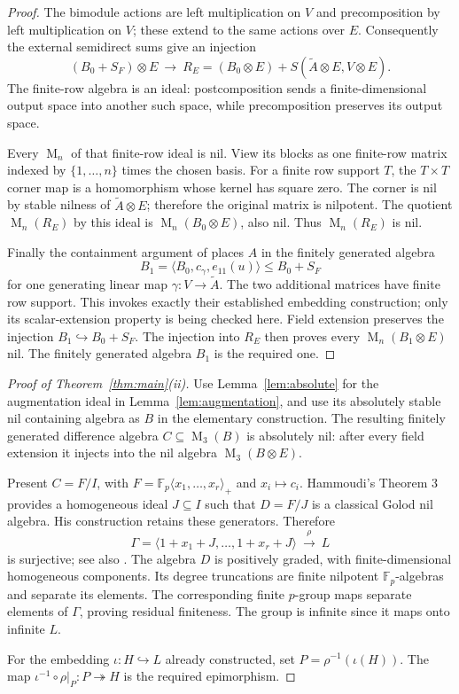 \documentclass[11pt]{article}
\theoremstyle{definition}
\newcommand{\Fp}{\mathbb F_p}
\newcommand{\Mat}{\operatorname{M}}
\begin{document}
\begin{proof}
The bimodule actions are left multiplication on \(V\) and precomposition
by left multiplication on \(V\); these extend to the same actions over
\(E\). Consequently the external semidirect sums give an injection
\[
 (B_0+S_F)\otimes E\ \longrightarrow\
 R_E=(B_0\otimes E)+S(\widetilde A\otimes E,V\otimes E).
\]
The finite-row algebra is an ideal: postcomposition sends a finite-dimensional
output space into another such space, while precomposition preserves its
output space.

Every \(\Mat_n\) of that finite-row ideal is nil. View its blocks as
one finite-row matrix indexed by \(\{1,\ldots,n\}\) times the chosen basis.
For a finite row support \(T\), the \(T\times T\) corner map is a
homomorphism whose kernel has square zero. The corner is nil by stable
nilness of \(\widetilde A\otimes E\); therefore the original matrix is
nilpotent. The quotient \(\Mat_n(R_E)\) by this ideal is
\(\Mat_n(B_0\otimes E)\), also nil. Thus \(\Mat_n(R_E)\) is nil.

Finally the containment argument of \cite[proof of Theorem 4.3]{AAJZ}
places \(A\) in the finitely generated algebra
\[
 B_1=\langle B_0,c_\gamma,e_{11}(u)\rangle\leq B_0+S_F
\]
for one generating linear map \(\gamma:V\to\widetilde A\).
The two additional matrices have finite row support.
This invokes exactly their established embedding construction; only
its scalar-extension property is being checked here.
Field extension preserves the injection \(B_1\hookrightarrow B_0+S_F\).
The injection into \(R_E\) then proves every \(\Mat_n(B_1\otimes E)\)
nil. The finitely generated algebra \(B_1\) is the required one.
\end{proof}

\begin{proof}[Proof of Theorem~\ref{thm:main}(ii)]
Use Lemma~\ref{lem:absolute} for the augmentation ideal in
Lemma~\ref{lem:augmentation}, and use its absolutely stable nil containing
algebra as \(B\) in the elementary construction.
The resulting finitely generated difference algebra
\(C\subseteq\Mat_3(B)\) is absolutely nil: after every field extension it
injects into the nil algebra \(\Mat_3(B\otimes E)\).

Present \(C=F/I\), with \(F=\Fp\langle x_1,\ldots,x_r\rangle_+\)
and \(x_i\mapsto c_i\). Hammoudi's Theorem 3 \cite[p.~96]{Hammoudi}
provides a homogeneous ideal \(J\subseteq I\) such that \(D=F/J\)
is a classical Golod nil algebra. His construction retains these
generators. Therefore
\[
 \Gamma=\langle1+x_1+J,\ldots,1+x_r+J\rangle
   \ \xrightarrow{\ \rho\ }\ L
\]
is surjective; see also \cite[Corollary 3]{Hammoudi}.
The algebra \(D\) is positively graded, with finite-dimensional homogeneous
components. Its degree truncations are finite nilpotent \(\Fp\)-algebras
and separate its elements. The corresponding finite \(p\)-group maps
separate elements of \(\Gamma\), proving residual finiteness.
The group is infinite since it maps onto infinite \(L\).

For the embedding \(\iota:H\hookrightarrow L\) already constructed, set
\(P=\rho^{-1}(\iota(H))\). The map
\(\iota^{-1}\circ\rho|_P:P\twoheadrightarrow H\) is the required epimorphism.
\end{proof}
\end{document}
